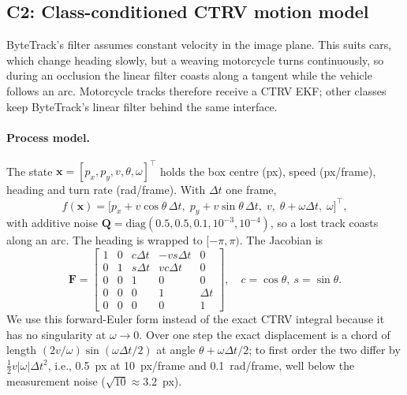 \documentclass[twocolumn]{svjour3}
\begin{document}
\subsection{C2: Class-conditioned CTRV motion model}\label{sec:c2}

ByteTrack's filter assumes constant velocity in the image plane. This suits
cars, which change heading slowly, but a weaving motorcycle turns continuously,
so during an occlusion the linear filter coasts along a tangent while the
vehicle follows an arc. Motorcycle tracks therefore receive a CTRV EKF; other
classes keep ByteTrack's linear filter behind the same interface.

\paragraph{Process model.}
The state $\mathbf{x}=[p_x,p_y,v,\theta,\omega]^{\top}$ holds the box centre
(px), speed (px/frame), heading and turn rate (rad/frame). With $\Delta t$ one
frame,
\begin{equation}
f(\mathbf{x})=\bigl[p_x+v\cos\theta\,\Delta t,\;p_y+v\sin\theta\,\Delta t,\;
v,\;\theta+\omega\Delta t,\;\omega\bigr]^{\top},\label{eq:ctrv}
\end{equation}
with additive noise $\mathbf{Q}=\mathrm{diag}(0.5,0.5,0.1,10^{-3},10^{-4})$, so a
lost track coasts along an arc. The heading is wrapped to $[-\pi,\pi)$. The
Jacobian is
\begin{equation}
\mathbf{F}=\begin{bmatrix}
1&0&c\Delta t&-vs\Delta t&0\\
0&1&s\Delta t&vc\Delta t&0\\
0&0&1&0&0\\
0&0&0&1&\Delta t\\
0&0&0&0&1
\end{bmatrix},\quad c=\cos\theta,\ s=\sin\theta.\label{eq:jacobian}
\end{equation}
We use this forward-Euler form instead of the exact CTRV integral because it has
no singularity at $\omega\to0$. Over one step the exact displacement is a chord
of length $(2v/\omega)\sin(\omega\Delta t/2)$ at angle $\theta+\omega\Delta t/2$;
to first order the two differ by $\tfrac12 v|\omega|\Delta t^{2}$, i.e., 0.5~px at
10~px/frame and 0.1~rad/frame, well below the measurement noise
($\sqrt{10}\approx3.2$~px).
\end{document}

